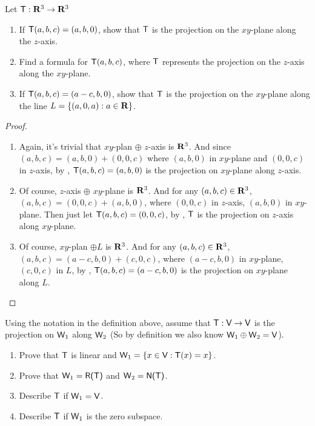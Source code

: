 \begin{exercise} \label{exercise 2.1.26}
Let \(\textsf{T}: \mathbf{R}^3 \to \mathbf{R}^3\)
\begin{enumerate}
\item If \(\textsf{T}(a, b, c) = (a, b, 0)\), show that \(\textsf{T}\) is the projection on the \(xy\)-plane along the \(z\)-axis.
\item Find a formula for \(\textsf{T}(a, b, c)\), where \(\textsf{T}\) represents the projection on the \(z\)-axis along the \(xy\)-plane.
\item If \(\textsf{T}(a, b, c) = (a - c, b, 0)\), show that \(\textsf{T}\) is the projection on the \(xy\)-plane along the line \(L = \{ (a, 0, a) : a \in \mathbf{R} \}\).
\end{enumerate}
\end{exercise}

\begin{proof} \ 
\begin{enumerate}
\item Again, it's trivial that \(xy\)-plan \(\oplus\) \(z\)-axis is \(\mathbf{R}^3\).
And since \((a, b, c) = (a, b, 0) + (0, 0, c)\) where \((a, b, 0)\) in \(xy\)-plane and \((0, 0, c)\) in \(z\)-axis, by , \(\textsf{T}(a, b, c) = (a, b, 0)\) is the projection on \(xy\)-plane along \(z\)-axis.

\item Of course, \(z\)-axis \(\oplus\) \(xy\)-plane is \(\mathbf{R}^3\).
And for any \((a, b, c) \in \mathbf{R}^3\), \((a, b, c) = (0, 0, c) + (a, b, 0)\), where \((0, 0, c)\) in \(z\)-axis, \((a, b, 0)\) in \(xy\)-plane.
Then just let \(\textsf{T}(a, b, c) = (0, 0, c)\), by \ADEF{2.2}, \(\textsf{T}\) is the projection on \(z\)-axis along \(xy\)-plane.

\item Of course, \(xy\)-plan \(\oplus L\) is \(\mathbf{R}^3\).
And for any \((a, b, c) \in \mathbf{R}^3\), \((a, b, c) = (a - c, b, 0) + (c, 0, c)\), where \((a - c, b, 0)\) in \(xy\)-plane, \((c, 0, c)\) in \(L\),
by \ADEF{2.2}, \(\textsf{T}(a, b, c) = (a - c, b, 0)\) is the projection on \(xy\)-plane along \(L\).
\end{enumerate}
\end{proof}

\begin{exercise} \label{exercise 2.1.27}
Using the notation in the definition above, assume that \(\textsf{T} : \textsf{V} \to \textsf{V}\) is the projection on \(\textsf{W}_1\) along \(\textsf{W}_2\)
(So by definition we also know \(\textsf{W}_1 \oplus \textsf{W}_2 = \textsf{V}\)).
\begin{enumerate}
\item Prove that \(\textsf{T}\) is linear and \(\textsf{W}_1 = \{ x \in \textsf{V}: \textsf{T}(x) = x \}\).
\item Prove that \(\textsf{W}_1 = \textsf{R(T)}\) and \(\textsf{W}_2 = \textsf{N(T)}\).
\item Describe \(\textsf{T}\) if \(\textsf{W}_1 = \textsf{V}\).
\item Describe \(\textsf{T}\) if \(\textsf{W}_1\) is the zero subspace.
\end{enumerate}
\end{exercise}

